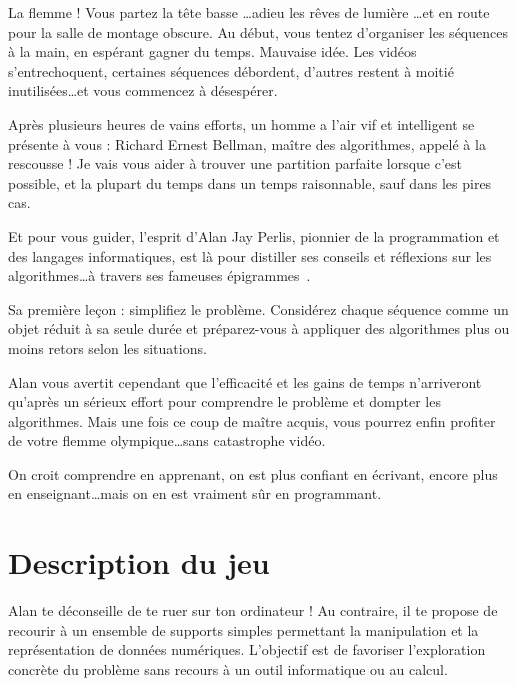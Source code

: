 \documentclass[a4paper,twoside]{article}
\begin{document}
La flemme !
Vous partez la tête basse \dots adieu les rêves de lumière \dots et en route pour la salle de montage obscure.
Au début, vous tentez d'organiser les séquences à la main, en espérant gagner du temps.
Mauvaise idée. Les vidéos s'entrechoquent, certaines séquences débordent, d'autres restent à moitié inutilisées\dots et vous commencez à désespérer.


Après plusieurs heures de vains efforts, un homme a l'air vif et intelligent se présente à vous :
\og Richard Ernest Bellman, maître des algorithmes, appelé à la rescousse !
Je vais vous aider à trouver une partition parfaite lorsque c'est possible, et la plupart du temps dans un temps raisonnable, sauf dans les pires cas.
\fg

Et pour vous guider, l'esprit d'Alan Jay Perlis, pionnier de la programmation et des langages informatiques, est là pour distiller ses conseils et réflexions sur les algorithmes\dots à travers ses fameuses épigrammes~\cite{Perlis1982}.

Sa première leçon : simplifiez le problème.
Considérez chaque séquence comme un objet réduit à sa seule durée et préparez-vous à appliquer des algorithmes plus ou moins retors selon les situations.

Alan vous avertit cependant que l'efficacité et les gains de temps n'arriveront qu'après un sérieux effort pour comprendre le problème et dompter les algorithmes.
Mais une fois ce coup de maître acquis, vous pourrez enfin profiter de votre flemme olympique\dots sans catastrophe vidéo.

\begin{epigramme}
  On croit comprendre en apprenant, on est plus confiant en écrivant, encore plus en enseignant\dots mais on en est vraiment sûr en programmant.
\end{epigramme}


\nocite{MartelloToth1990,Mertens2003}



\section{Description du jeu}
\label{sec:jeu}

Alan te déconseille de te ruer sur ton ordinateur !
Au contraire, il te propose de recourir à un ensemble de supports simples permettant la manipulation et la représentation de données numériques.
L'objectif est de favoriser l'exploration concrète du problème sans recours à un outil informatique ou au calcul.
\end{document}

